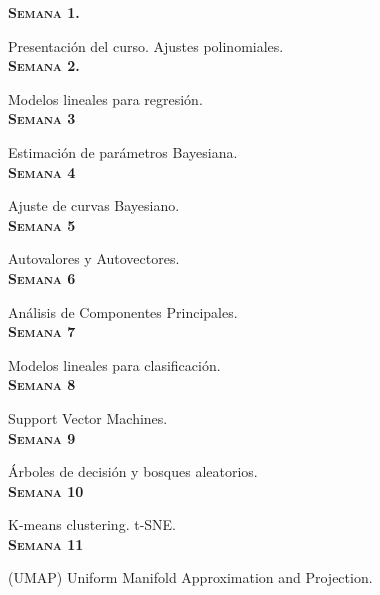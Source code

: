 \documentclass[letterpaper,10pt,onecolumn]{article}
\begin{document}

\noindent\textbf{\textsc{Semana 1.}} 

Presentaci\'on del curso. Ajustes polinomiales. 
\\[-0.3cm] %

\noindent\textbf{\textsc{Semana 2.}} 

Modelos lineales para regresi\'on. 
\\[-0.3cm] %

\noindent\textbf{\textsc{Semana 3}}

Estimaci\'on de par\'ametros Bayesiana.
\\[-0.3cm] %

\noindent\textbf{\textsc{Semana 4}}

Ajuste de curvas Bayesiano.
\\[-0.3cm] %


\noindent\textbf{\textsc{Semana 5}}

Autovalores y Autovectores.
\\[-0.3cm] %

\noindent\textbf{\textsc{Semana 6}}

An\'alisis de Componentes Principales.
\\[-0.3cm] %

\noindent\textbf{\textsc{Semana 7}}

Modelos lineales para clasificaci\'on.
\\[-0.3cm] %

\noindent\textbf{\textsc{Semana 8}}

Support Vector Machines.
\\[-0.3cm] %

\noindent\textbf{\textsc{Semana 9}}

\'Arboles de decisi\'on y bosques aleatorios.
\\[-0.3cm] %

\noindent\textbf{\textsc{Semana 10}}

K-means clustering. t-SNE.
\\[-0.3cm]

\noindent\textbf{\textsc{Semana 11}}

(UMAP) Uniform Manifold Approximation and Projection.
\\[-0.3cm]
\end{document}

